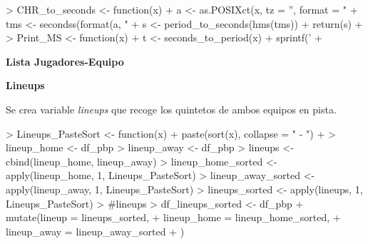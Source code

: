 \documentclass[paper=a4, fontsize=9pt]{article}
\begin{document}
\begin{Schunk}
\begin{Sinput}
> CHR_to_seconds <- function(x){
+   a <- as.POSIXct(x, tz = '', format = "%
+   tms <- secondss(format(a, "%
+   s <- period_to_seconds(hms(tms))
+   return(s)
+ }
> Print_MS <- function(x){
+   t <- seconds_to_period(x)
+   sprintf('%
+ }
\end{Sinput}
\end{Schunk}

\textbf{Lista Jugadores-Equipo}

\begin{Schunk}
\end{Schunk}

\textbf{Lineups}

Se crea variable \emph{lineups} que recoge los quintetos de ambos equipos en pista.


\begin{Schunk}
\begin{Sinput}
> Lineups_PasteSort <- function(x) {
+   paste(sort(x), collapse = " - ")
+ }
> lineup_home <- df_pbp %
> lineup_away <- df_pbp %
> lineups     <- cbind(lineup_home, lineup_away)
> lineup_home_sorted <- apply(lineup_home, 1, Lineups_PasteSort)
> lineup_away_sorted <- apply(lineup_away, 1, Lineups_PasteSort)
> lineups_sorted     <- apply(lineups, 1, Lineups_PasteSort)
> #lineups
> df_lineups_sorted <- df_pbp %
+   mutate(lineup = lineups_sorted,
+     lineup_home = lineup_home_sorted,
+     lineup_away = lineup_away_sorted
+   ) %
\end{Sinput}
\end{Schunk}
\end{document}
